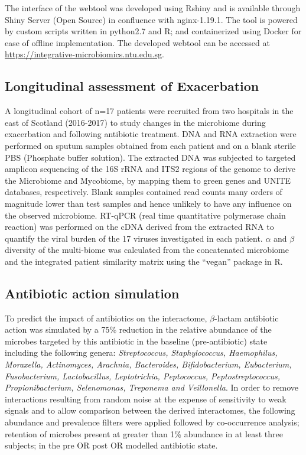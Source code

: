 The interface of the webtool was developed using Rshiny and is available through Shiny Server (Open Source) in confluence with nginx-1.19.1. The tool is powered by custom scripts written in python2.7 and R; and containerized using Docker for ease of offline implementation. The developed webtool can be accessed at \url{https://integrative-microbiomics.ntu.edu.sg}.

\subsection{Longitudinal assessment of Exacerbation}

A longitudinal cohort of n=17 patients were recruited from two hospitals in the east of Scotland (2016-2017) to study changes in the microbiome during exacerbation and following antibiotic treatment. DNA and RNA extraction were performed on sputum samples obtained from each patient and on a blank sterile PBS (Phosphate buffer solution). The extracted DNA was subjected to targeted amplicon sequencing of the 16S rRNA and ITS2 regions of the genome to derive the Microbiome and Mycobiome, by mapping them to green genes and UNITE databases, respectively. Blank samples contained read counts many orders of magnitude lower than test samples and hence unlikely to have any influence on the observed microbiome. RT-qPCR (real time quantitative polymerase chain reaction) was performed on the cDNA derived from the extracted RNA to quantify the viral burden of the 17 viruses investigated in each patient. $\alpha$ and $\beta$ diversity of the multi-biome was calculated from the concatenated microbiome and the integrated patient similarity matrix using the “vegan” package in R.

\subsection{Antibiotic action simulation}

To predict the impact of antibiotics on the interactome, $\beta$-lactam antibiotic action was simulated by a 75\% reduction in the relative abundance of the microbes targeted by this antibiotic in the baseline (pre-antibiotic) state including the following genera: \emph{Streptococcus, Staphylococcus, Haemophilus, Moraxella, Actinomyces, Arachnia, Bacteroides, Bifidobacterium, Eubacterium, Fusobacterium, Lactobacillus, Leptotrichia, Peptococcus, Peptostreptococcus, Propionibacterium, Selenomonas, Treponema and Veillonella}. In order to remove interactions resulting from random noise at the expense of sensitivity to weak signals and to allow comparison between the derived interactomes, the following abundance and prevalence filters were applied followed by co-occurrence analysis; retention of microbes present at greater than 1\% abundance in at least three subjects; in the pre OR post OR modelled antibiotic state.

